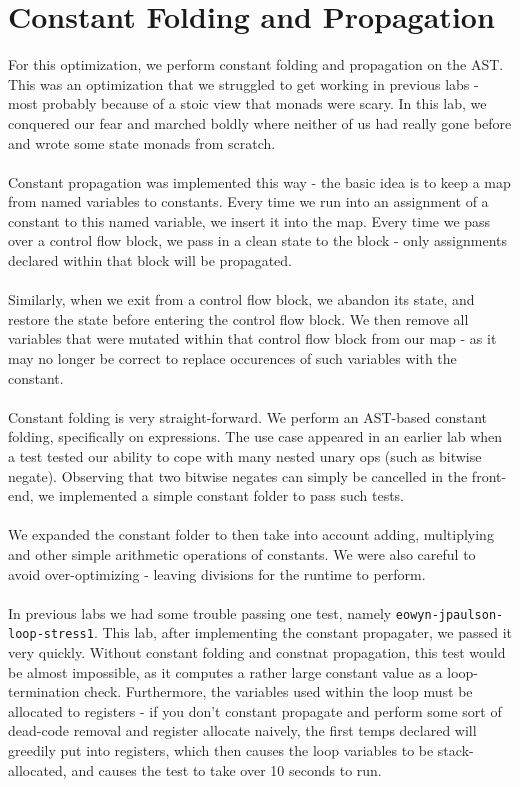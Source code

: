 \documentclass[11pt]{article}
\begin{document}
\section{Constant Folding and Propagation}
For this optimization, we perform constant folding and propagation on the AST. This
was an optimization that we struggled to get working in previous labs - most probably because
of a stoic view that monads were scary. In this lab, we conquered our fear and marched boldly
where neither of us had really gone before and wrote some state monads from scratch. \\
\\
Constant propagation was implemented this way - the basic idea is to keep a map from named
variables to constants. Every time we run into an assignment of a constant to this named
variable, we insert it into the map. Every time we pass over a control flow block, we pass
in a clean state to the block - only assignments declared within that block will be propagated. \\
\\
Similarly, when we exit from a control flow block, we abandon its state, and restore the state
before entering the control flow block. We then remove all variables that were mutated within that
control flow block from our map - as it may no longer be correct to replace occurences of such
variables with the constant. \\
\\
Constant folding is very straight-forward. We perform an AST-based constant folding, specifically
on expressions. The use case appeared in an earlier lab when a test tested our ability to cope with
many nested unary ops (such as bitwise negate). Observing that two bitwise negates can simply be
cancelled in the front-end, we implemented a simple constant folder to pass such tests. \\
\\
We expanded the constant folder to then take into account adding, multiplying and other simple
arithmetic operations of constants. We were also careful to avoid over-optimizing - leaving
divisions for the runtime to perform.\\
\\
In previous labs we had some trouble passing one test, namely \verb+eowyn-jpaulson-loop-stress1+.
This lab, after implementing the constant propagater, we passed it very quickly. Without
constant folding and constnat propagation, this test would be almost impossible, as it computes
a rather large constant value as a loop-termination check. Furthermore, the variables used
within the loop must be allocated to registers - if you don't constant propagate and perform
some sort of dead-code removal and register allocate naively, the first temps declared will
greedily put into registers, which then causes the loop variables to be stack-allocated,
and causes the test to take over 10 seconds to run.
\end{document}
